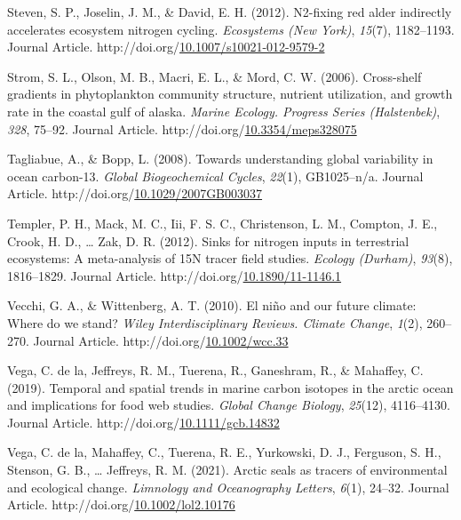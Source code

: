 \documentclass [11pt, proquest] {uwthesis}[2015/03/03]
\newlength{\cslhangindent}
\newenvironment{CSLReferences}%
{\setlength{\parindent}{0pt}%
\everypar{\setlength{\hangindent}{\cslhangindent}}\ignorespaces}%
{\par}
\begin{document}
\begin{CSLReferences}{1}{0}
\leavevmode\hypertarget{ref-Perakis2012}{}%
Steven, S. P., Joselin, J. M., \& David, E. H. (2012). N2-fixing red alder indirectly accelerates ecosystem nitrogen cycling. \emph{Ecosystems (New York)}, \emph{15}(7), 1182--1193. Journal Article. http://doi.org/\href{https://doi.org/10.1007/s10021-012-9579-2}{10.1007/s10021-012-9579-2}

\leavevmode\hypertarget{ref-Strom2006}{}%
Strom, S. L., Olson, M. B., Macri, E. L., \& Mord, C. W. (2006). Cross-shelf gradients in phytoplankton community structure, nutrient utilization, and growth rate in the coastal gulf of alaska. \emph{Marine Ecology. Progress Series (Halstenbek)}, \emph{328}, 75--92. Journal Article. http://doi.org/\href{https://doi.org/10.3354/meps328075}{10.3354/meps328075}

\leavevmode\hypertarget{ref-Tagliabue2008}{}%
Tagliabue, A., \& Bopp, L. (2008). Towards understanding global variability in ocean carbon-13. \emph{Global Biogeochemical Cycles}, \emph{22}(1), GB1025--n/a. Journal Article. http://doi.org/\href{https://doi.org/10.1029/2007GB003037}{10.1029/2007GB003037}

\leavevmode\hypertarget{ref-Templer2012}{}%
Templer, P. H., Mack, M. C., Iii, F. S. C., Christenson, L. M., Compton, J. E., Crook, H. D., \ldots{} Zak, D. R. (2012). Sinks for nitrogen inputs in terrestrial ecosystems: A meta-analysis of 15N tracer field studies. \emph{Ecology (Durham)}, \emph{93}(8), 1816--1829. Journal Article. http://doi.org/\href{https://doi.org/10.1890/11-1146.1}{10.1890/11-1146.1}

\leavevmode\hypertarget{ref-Vecchi2010}{}%
Vecchi, G. A., \& Wittenberg, A. T. (2010). El niño and our future climate: Where do we stand? \emph{Wiley Interdisciplinary Reviews. Climate Change}, \emph{1}(2), 260--270. Journal Article. http://doi.org/\href{https://doi.org/10.1002/wcc.33}{10.1002/wcc.33}

\leavevmode\hypertarget{ref-delaVega2019}{}%
Vega, C. de la, Jeffreys, R. M., Tuerena, R., Ganeshram, R., \& Mahaffey, C. (2019). Temporal and spatial trends in marine carbon isotopes in the arctic ocean and implications for food web studies. \emph{Global Change Biology}, \emph{25}(12), 4116--4130. Journal Article. http://doi.org/\href{https://doi.org/10.1111/gcb.14832}{10.1111/gcb.14832}

\leavevmode\hypertarget{ref-delaVega2021}{}%
Vega, C. de la, Mahaffey, C., Tuerena, R. E., Yurkowski, D. J., Ferguson, S. H., Stenson, G. B., \ldots{} Jeffreys, R. M. (2021). Arctic seals as tracers of environmental and ecological change. \emph{Limnology and Oceanography Letters}, \emph{6}(1), 24--32. Journal Article. http://doi.org/\href{https://doi.org/10.1002/lol2.10176}{10.1002/lol2.10176}


\end{CSLReferences}
\end{document}
